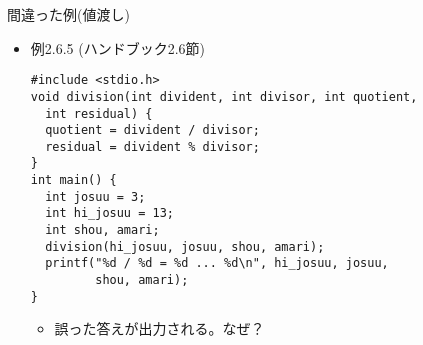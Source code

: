 \begin{frame}[t,fragile]{間違った例(値渡し)}
  \begin{itemize}
  \item 例2.6.5 (ハンドブック2.6節)
\begin{lstlisting}
#include <stdio.h>
void division(int divident, int divisor, int quotient,
  int residual) {
  quotient = divident / divisor;
  residual = divident % divisor;
}
int main() {
  int josuu = 3;
  int hi_josuu = 13;
  int shou, amari;
  division(hi_josuu, josuu, shou, amari);
  printf("%d / %d = %d ... %d\n", hi_josuu, josuu,
         shou, amari);
}
\end{lstlisting}
\begin{itemize}
\item 誤った答えが出力される。なぜ？
\end{itemize}
  \end{itemize}
\end{frame}

